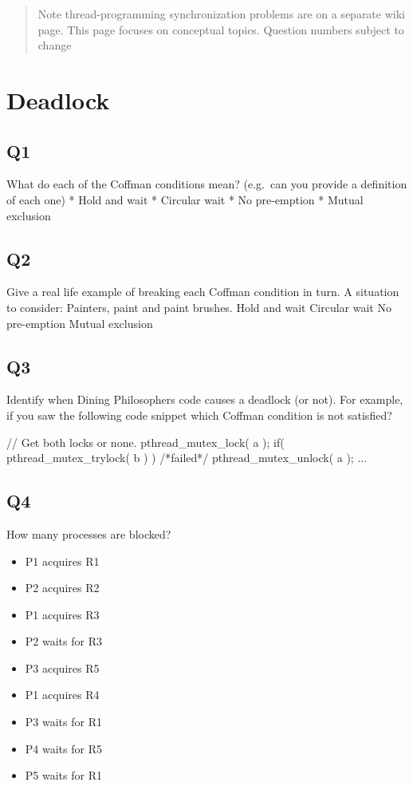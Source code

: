 \begin{quote}
Note thread-programming synchronization problems are on a separate wiki page. This page focuses on conceptual topics. Question numbers subject to change
\end{quote}

\section{Deadlock}

\subsection{Q1}\label{q1-1}

What do each of the Coffman conditions mean? (e.g.~can you provide a definition of each one) * Hold and wait * Circular wait * No pre-emption * Mutual exclusion

\subsection{Q2}\label{q2-1}

Give a real life example of breaking each Coffman condition in turn. A situation to consider: Painters, paint and paint brushes. Hold and wait Circular wait No pre-emption Mutual exclusion

\subsection{Q3}\label{q3-1}

Identify when Dining Philosophers code causes a deadlock (or not). For example, if you saw the following code snippet which Coffman condition is not satisfied?

\begin{code}[language=C]
// Get both locks or none.
pthread_mutex_lock( a );
if( pthread_mutex_trylock( b ) ) { /*failed*/
   pthread_mutex_unlock( a );
   ...
}
\end{code}

\subsection{Q4}\label{q4-1}

How many processes are blocked?

\begin{itemize}
\tightlist
\item
  P1 acquires R1
\item
  P2 acquires R2
\item
  P1 acquires R3
\item
  P2 waits for R3
\item
  P3 acquires R5
\item
  P1 acquires R4
\item
  P3 waits for R1
\item
  P4 waits for R5
\item
  P5 waits for R1
\end{itemize}

